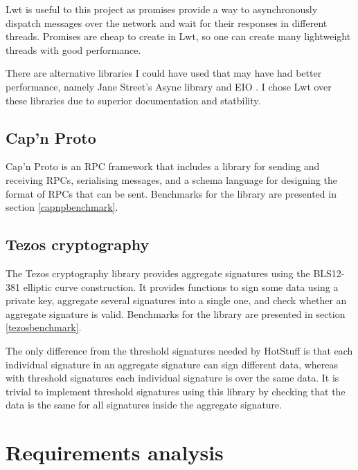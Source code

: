 Lwt is useful to this project as promises provide a way to asynchronously dispatch messages over the network and wait for their responses in different threads. Promises are cheap to create in Lwt, so one can create many lightweight threads with good performance.

There are alternative libraries I could have used that may have had better performance, namely Jane Street's Async library \cite{async} and EIO \cite{eio}. I chose Lwt over these libraries due to superior documentation and statbility.

\subsection{Cap'n Proto}
Cap'n Proto  \cite{capnp} is an RPC framework that includes a library for sending and receiving RPCs, serialising messages, and a schema language for designing the format of RPCs that can be sent. Benchmarks for the library are presented in section \ref{capnpbenchmark}.

\subsection{Tezos cryptography} \label{tezos}
The Tezos cryptography library \cite{tezosCrypto} provides aggregate signatures using the BLS12-381 elliptic curve construction. It provides functions to sign some data using a private key, aggregate several signatures into a single one, and check whether an aggregate signature is valid. Benchmarks for the library are presented in section \ref{tezosbenchmark}.

The only difference from the threshold signatures needed by HotStuff is that each individual signature in an aggregate signature can sign different data, whereas with threshold signatures each individual signature is over the same data. It is trivial to implement threshold signatures using this library by checking that the data is the same for all signatures inside the aggregate signature.

\section{Requirements analysis} \label{requirements}

